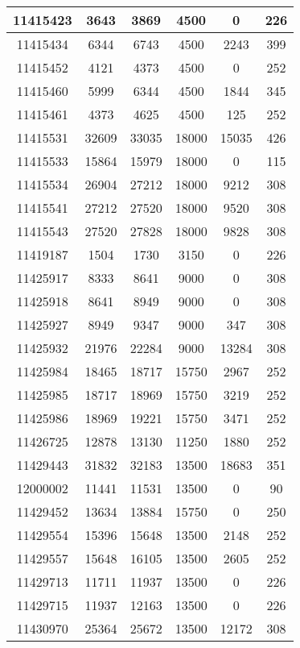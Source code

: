 \begin{appendices}
\begin{center}
\begin{longtable}{|c|c|c|c|c|c|}
11415423 & 3643  & 3869  & 4500  & 0     & 226 \\ \hline
11415434 & 6344  & 6743  & 4500  & 2243  & 399 \\ \hline
11415452 & 4121  & 4373  & 4500  & 0     & 252 \\ \hline
11415460 & 5999  & 6344  & 4500  & 1844  & 345 \\ \hline
11415461 & 4373  & 4625  & 4500  & 125   & 252 \\ \hline
11415531 & 32609 & 33035 & 18000 & 15035 & 426 \\ \hline
11415533 & 15864 & 15979 & 18000 & 0     & 115 \\ \hline
11415534 & 26904 & 27212 & 18000 & 9212  & 308 \\ \hline
11415541 & 27212 & 27520 & 18000 & 9520  & 308 \\ \hline
11415543 & 27520 & 27828 & 18000 & 9828  & 308 \\ \hline
11419187 & 1504  & 1730  & 3150  & 0     & 226 \\ \hline
11425917 & 8333  & 8641  & 9000  & 0     & 308 \\ \hline
11425918 & 8641  & 8949  & 9000  & 0     & 308 \\ \hline
11425927 & 8949  & 9347  & 9000  & 347   & 308 \\ \hline
11425932 & 21976 & 22284 & 9000  & 13284 & 308 \\ \hline
11425984 & 18465 & 18717 & 15750 & 2967  & 252 \\ \hline
11425985 & 18717 & 18969 & 15750 & 3219  & 252 \\ \hline
11425986 & 18969 & 19221 & 15750 & 3471  & 252 \\ \hline
11426725 & 12878 & 13130 & 11250 & 1880  & 252 \\ \hline
11429443 & 31832 & 32183 & 13500 & 18683 & 351 \\ \hline
12000002 & 11441 & 11531 & 13500 & 0     & 90  \\ \hline
11429452 & 13634 & 13884 & 15750 & 0     & 250 \\ \hline
11429554 & 15396 & 15648 & 13500 & 2148  & 252 \\ \hline
11429557 & 15648 & 16105 & 13500 & 2605  & 252 \\ \hline
11429713 & 11711 & 11937 & 13500 & 0     & 226 \\ \hline
11429715 & 11937 & 12163 & 13500 & 0     & 226 \\ \hline
11430970 & 25364 & 25672 & 13500 & 12172 & 308 \\ \hline

\end{longtable}
\end{center}
\end{appendices}
